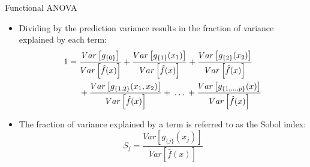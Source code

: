 \documentclass[11pt,compress,t,notes=noshow, aspectratio=169, xcolor=table]{beamer}
\begin{document}
\begin{frame}{Functional ANOVA}

\begin{itemize}
\item Dividing by the prediction variance results in the fraction of variance explained by each term:
\begin{align*}
1 &= \frac{Var\left[g_{\{0\}}\right]}{\predvar} + \frac{Var\left[g_{\{1\}}(x_1)\right]}{\predvar} + \frac{Var\left[g_{\{2\}}(x_2)\right]}{\predvar} \\
&\phantom{{}={}} + \frac{Var\left[g_{\{1, 2\}}(x_1, x_2)\right]}{\predvar} + \;\dots\; + \frac{Var\left[g_{\{1,\ldots,p\}}(x)\right]}{\predvar}
\end{align*}

\item The fraction of variance explained by a term is referred to as the Sobol index:
$$
S_j = \frac{Var\left[g_{\{j\}}(x_j)\right]}{Var\left[\hat{f}(x)\right]}
$$
\end{itemize}

\end{frame}


\endlecture
\end{document}
